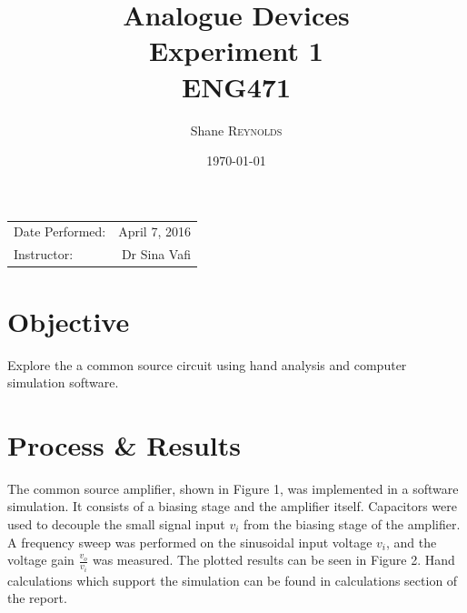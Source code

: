 \documentclass{article}
\title{Analogue Devices \\ Experiment 1 \\ ENG471} %
\author{Shane \textsc{Reynolds}} %
\date{\today} %
\begin{document}
\maketitle %

\begin{center}
\begin{tabular}{l r}
Date Performed: & April 7, 2016 \\ %
Instructor: & Dr Sina Vafi %
\end{tabular}
\end{center}



\section{Objective}

Explore the a common source circuit using hand analysis and computer simulation software.


\section{Process \& Results}

The common source amplifier, shown in Figure 1, was implemented in a software simulation. It consists of a biasing stage and the amplifier itself. Capacitors were used to decouple the small signal input $v_i$ from the biasing stage of the amplifier. A frequency sweep was performed on the sinusoidal input voltage $v_i$, and the voltage gain $\frac{v_o}{v_i}$ was measured. The plotted results can be seen in Figure 2. Hand calculations which support the simulation can be found in calculations section of the report.
\end{document}
